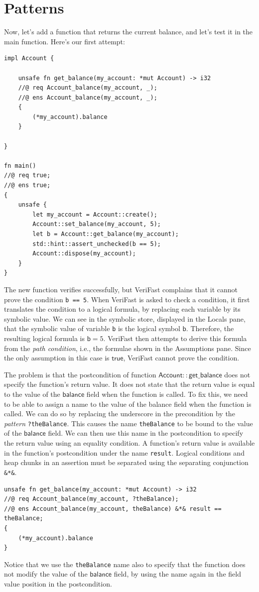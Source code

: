 \documentclass{article}
\begin{document}
\section{Patterns}

Now, let's add a function that returns the current balance, and
let's test it in the main function. Here's our first attempt:

\begin{lstlisting}
impl Account { 

    unsafe fn get_balance(my_account: *mut Account) -> i32
    //@ req Account_balance(my_account, _);
    //@ ens Account_balance(my_account, _);
    {
        (*my_account).balance
    }    

}

fn main()
//@ req true;
//@ ens true;
{
    unsafe {
        let my_account = Account::create();
        Account::set_balance(my_account, 5);
        let b = Account::get_balance(my_account);
        std::hint::assert_unchecked(b == 5);
        Account::dispose(my_account);
    }
}
\end{lstlisting}

The new function verifies successfully, but VeriFast complains
that it cannot prove the condition \lstinline!b == 5!. When
VeriFast is asked to check a condition, it first translates the
condition to a logical formula, by replacing each variable by
its symbolic value. We can see in the symbolic store, displayed
in the Locals pane, that the symbolic value of variable
\lstinline|b| is the logical symbol $\mathsf{b}$. Therefore, the
resulting logical formula is $\mathsf{b} = 5$. VeriFast then
attempts to derive this formula from the \emph{path condition},
i.e., the formulae shown in the Assumptions pane. Since the
only assumption in this case is $\mathsf{true}$, VeriFast
cannot prove the condition.

The problem is that the postcondition of function
$\mathsf{Account{::}get\_balance}$ does not specify the
function's return value. It does not state that the return
value is equal to the value of the $\mathsf{balance}$ field
when the function is called. To fix this, we need to be able to
assign a name to the value of the balance field when the
function is called. We can do so by replacing the underscore in
the precondition by the \emph{pattern} \lstinline!?theBalance!.
This causes the name \lstinline!theBalance! to be bound to the
value of the $\mathsf{balance}$ field. We can then use this
name in the postcondition to specify the return value using an
equality condition. A function's return value is available in
the function's postcondition under the name \lstinline!result!.
Logical conditions and heap chunks in an assertion must be
separated using the separating conjunction \lstinline!&*&!.
\begin{lstlisting}
unsafe fn get_balance(my_account: *mut Account) -> i32
//@ req Account_balance(my_account, ?theBalance);
//@ ens Account_balance(my_account, theBalance) &*& result == theBalance;
{
    (*my_account).balance
}    
\end{lstlisting}
Notice that we use the \lstinline!theBalance! name also to
specify that the function does not modify the value of the
$\mathsf{balance}$ field, by using the name again in the field
value position in the postcondition.
\end{document}
